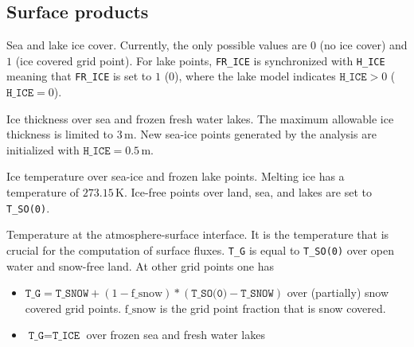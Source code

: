 \subsection{Surface products}
\begin{description}[leftmargin=3.0cm,style=sameline]

 \item [FR\_ICE] Sea and lake ice cover. Currently, the only possible values are $0$ (no ice cover) and $1$ (ice covered grid point). For 
                 lake points, \texttt{FR\_ICE} is synchronized with \texttt{H\_ICE} meaning that \texttt{FR\_ICE} is set to $1$ ($0$), 
                 where the lake model indicates $\texttt{H\_ICE}>0$ ($\texttt{H\_ICE}=0$).

 \item [H\_ICE] Ice thickness over sea and frozen fresh water lakes. The maximum allowable ice thickness is limited to $3\,\mathrm{m}$. 
                New sea-ice points generated by the analysis are initialized with $\texttt{H\_ICE}=0.5\,\mathrm{m}$.

 \item [T\_ICE] Ice temperature over sea-ice and frozen lake points. Melting ice has a temperature of $273.15\,\mathrm{K}$. Ice-free 
                points over land, sea, and lakes are set to \texttt{T\_SO(0)}.

 \item [T\_G]   Temperature at the atmosphere-surface interface. It is the temperature that is crucial for the computation of surface fluxes. 
                \texttt{T\_G} is equal to \texttt{T\_SO(0)} over open water and snow-free land. At other grid points one has
                \begin{itemize} 
                  \item $\texttt{T\_G}=\texttt{T\_SNOW} + (1 - \mathrm{f\_snow})*(\texttt{T\_SO(0)} - \texttt{T\_SNOW})$ over (partially) 
                        snow covered grid points. $\mathrm{f\_snow}$ is the grid point fraction that is snow covered.
                  \item $\texttt{T\_G}=\texttt{T\_ICE}$ over frozen sea and fresh water lakes
                \end{itemize}


\end{description}
